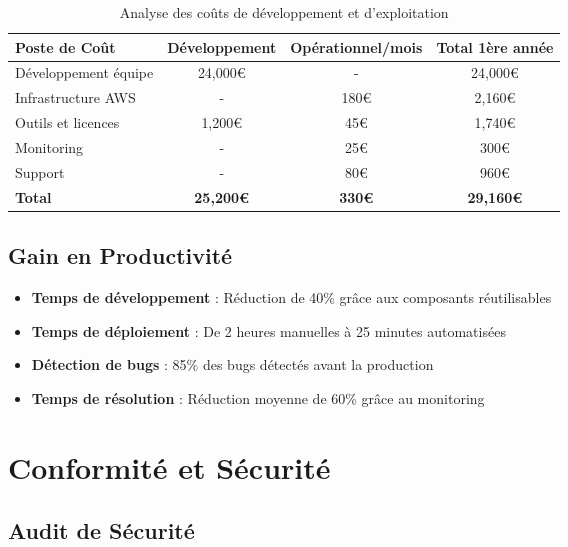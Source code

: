 \begin{table}[H]
    \centering
    \begin{tabularx}{\textwidth}{|l|c|c|c|}
        \hline
        \textbf{Poste de Coût} & \textbf{Développement} & \textbf{Opérationnel/mois} & \textbf{Total 1ère année} \\
        \hline
        Développement équipe & 24,000€ & - & 24,000€ \\
        \hline
        Infrastructure AWS & - & 180€ & 2,160€ \\
        \hline
        Outils et licences & 1,200€ & 45€ & 1,740€ \\
        \hline
        Monitoring & - & 25€ & 300€ \\
        \hline
        Support & - & 80€ & 960€ \\
        \hline
        \textbf{Total} & \textbf{25,200€} & \textbf{330€} & \textbf{29,160€} \\
        \hline
    \end{tabularx}
    \caption{Analyse des coûts de développement et d'exploitation}
    \label{tab:cost_analysis}
\end{table}

\subsection{Gain en Productivité}

\begin{itemize}
    \item \textbf{Temps de développement} : Réduction de 40\% grâce aux composants réutilisables
    \item \textbf{Temps de déploiement} : De 2 heures manuelles à 25 minutes automatisées
    \item \textbf{Détection de bugs} : 85\% des bugs détectés avant la production
    \item \textbf{Temps de résolution} : Réduction moyenne de 60\% grâce au monitoring
\end{itemize}

\section{Conformité et Sécurité}

\subsection{Audit de Sécurité}

